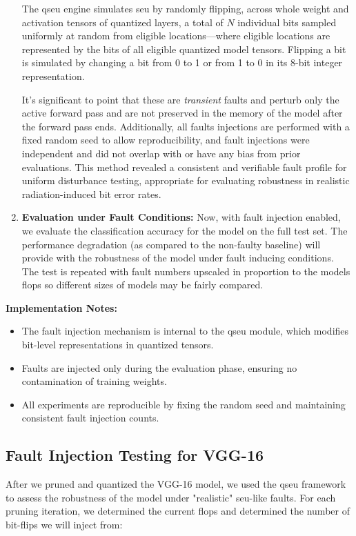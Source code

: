 \begin{enumerate}
        The \gls{qseu} engine simulates \gls{seu} by randomly flipping, across whole weight and activation tensors of quantized layers, a total of $N$ individual bits sampled uniformly at random from eligible locations—where eligible locations are represented by the bits of all eligible quantized model tensors. Flipping a bit is simulated by changing a bit from 0 to 1 or from 1 to 0 in its 8-bit integer representation.
        
        It's significant to point that these are \textit{transient} faults and perturb only the active forward pass and are not preserved in the memory of the model after the forward pass ends. Additionally, all faults injections are performed with a fixed random seed to allow reproducibility, and fault injections were independent and did not overlap with or have any bias from prior evaluations. This method revealed a consistent and verifiable fault profile for uniform disturbance testing, appropriate for evaluating robustness in realistic radiation-induced bit error rates.
        
        
        \item \textbf{Evaluation under Fault Conditions:} 
        Now, with fault injection enabled, we evaluate the classification accuracy for the model on the full test set. The performance degradation (as compared to the non-faulty baseline) will provide with the robustness of the model under fault inducing conditions. The test is repeated with fault numbers upscaled in proportion to the models \gls{flops} so different sizes of models may be fairly compared.
        \end{enumerate}
        
        \noindent
        \textbf{Implementation Notes:}
        \begin{itemize}
        \item The fault injection mechanism is internal to the \gls{qseu} module, which modifies bit-level representations in quantized tensors.
        \item Faults are injected only during the evaluation phase, ensuring no contamination of training weights.
        \item All experiments are reproducible by fixing the random seed and maintaining consistent fault injection counts.
        \end{itemize}
    
    
    
    
    
    \subsection{Fault Injection Testing for VGG-16}
        After we pruned and quantized the VGG-16 model, we used the \gls{qseu} framework to assess the robustness of the model under "realistic" \gls{seu}-like faults. For each pruning iteration, we determined the current \gls{flops} and determined the number of bit-flips we will inject from:
        
